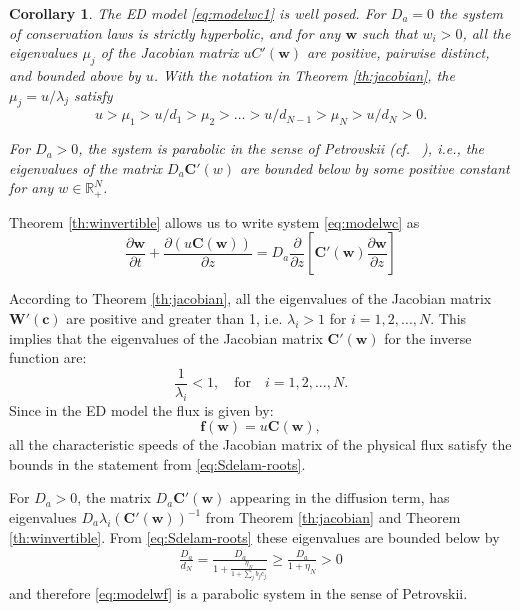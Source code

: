 \documentclass[preprint]{elsarticle}
\newtheorem{corollary}{Corollary}[section]
\theoremstyle{definition}
\def\rpn{\mathbb{R}_+^N}
\newcommand{\bw}{\boldsymbol w}
\newcommand{\bC}{\boldsymbol C}
\begin{document}
\begin{corollary}\label{cor:1}
  The ED model \eqref{eq:modelwc1} is well
  posed. For $D_a=0$ the system of conservation laws  is strictly
  hyperbolic, and for any $\bw$ such that $w_i>0$, all the
  eigenvalues $\mu_j$ of the Jacobian   matrix   $u C'(\bw)$ are positive,
  pairwise distinct, and bounded above by $u$. With the
  notation in Theorem \ref{th:jacobian}, the
  $\mu_j=u/\lambda_j$ satisfy
  \begin{equation*}  u > \mu_1 >u/d_1 > \mu_2  > \dots > u/d_{N-1} >
\mu_N > u/d_N > 0.
\end{equation*}

  
For $D_a>0$, the system
  is parabolic in the sense of Petrovskii
  (cf. ~\cite{EidelmanZhiharatshu98}), i.e., the eigenvalues of the
  matrix $D_a\bC'(w)$ are bounded below by some positive constant for
  any $w\in\rpn$.  
\end{corollary}
\begin{pf}
 Theorem \ref{th:winvertible} allows us to write  system \eqref{eq:modelwc} as
\begin{equation} \label{eq:modelwf}
\frac{\partial {\boldsymbol w}}{\partial t}+\frac{\partial (u
  {\boldsymbol C}(\boldsymbol w))}{\partial z}=D_a
\frac{\partial}{\partial z}\left[\boldsymbol C'(\boldsymbol
  w)\frac{\partial {\boldsymbol w}}{\partial z}\right] 
\end{equation}

According to Theorem \ref{th:jacobian}, all the eigenvalues of the
Jacobian matrix $\boldsymbol{W}'(\boldsymbol{c})$ are positive and
greater than 1, i.e. $\lambda_i >1$ for $i=1,2,...,N$. This implies
that the eigenvalues of the Jacobian matrix
$\boldsymbol{C}'(\boldsymbol{w})$ for the inverse function are: 
\[ \frac{1}{\lambda_i} < 1, \quad \mbox{for}\quad i=1,2,...,N. \]
Since in the ED model the flux is given by:
\[ \boldsymbol{f(w)} = u \boldsymbol{C}(\boldsymbol{w}), \]
all the characteristic speeds of the Jacobian matrix of the physical
flux satisfy the bounds in the statement from
\eqref{eq:Sdelam-roots}.

 For $D_a>0$, the matrix $D_a\boldsymbol
 C'(\boldsymbol w)$ appearing in the  diffusion term,
 has eigenvalues $D_a\lambda_i(\bC'(\bw))^{-1}$ from Theorem
 \ref{th:jacobian} and Theorem \ref{th:winvertible}. From
\eqref{eq:Sdelam-roots} these eigenvalues are bounded below by
\begin{align*}
  \frac{D_a}{ d_N}=\frac{D_a}{1+\frac{\eta_N}{1+\sum_jb_j c_j}}\geq
  \frac{D_a}{1+\eta_N} >0
\end{align*}
and therefore \eqref{eq:modelwf} is a
parabolic system  in the sense of Petrovskii.
  



\end{pf}  
\end{document}
